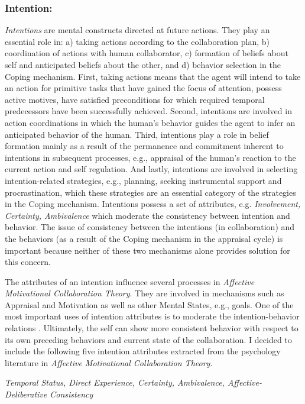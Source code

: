 \documentclass[letterpaper]{article}
\begin{document}
\subsubsection{Intention:}

\textit{Intentions} are mental constructs directed at future actions. They play
an essential role in: a) taking actions according to the collaboration plan, b)
coordination of actions with human collaborator, c) formation of beliefs about
self and anticipated beliefs about the other, and d) behavior selection in the
Coping mechanism. First, taking actions means that the agent will intend to take
an action for primitive tasks that have gained the focus of attention, possess
active motives, have satisfied preconditions for which required temporal
predecessors have been successfully achieved. Second, intentions are involved
in action coordinations in which the human's behavior guides the agent to infer
an anticipated behavior of the human. Third, intentions play a role in belief
formation mainly as a result of the permanence and commitment inherent to
intentions in subsequent processes, e.g., appraisal of the human's reaction to
the current action and self regulation. And lastly, intentions are involved in
selecting intention-related strategies, e.g., planning, seeking instrumental
support and procrastination, which these strategies are an essential category of
the strategies in the Coping mechanism. Intentions possess a set of attributes,
e.g. \textit{Involvement, Certainty, Ambivalence} which moderate the consistency
between intention and behavior. The issue of consistency between the intentions
(in collaboration) and the behaviors (as a result of the Coping mechanism in the
appraisal cycle) is important because neither of these two mechanisms alone
provides solution for this concern.

The attributes of an intention influence several processes in \textit{Affective
Motivational Collaboration Theory}. They are involved in mechanisms such as
Appraisal and Motivation as well as other Mental States, e.g., goals. One of the
most important uses of intention attributes is to moderate the
intention-behavior relations \cite{cooke:intention-behavior-consistency}.
Ultimately, the self can show more consistent behavior with respect to its own
preceding behaviors and current state of the collaboration. I decided to include
the following five intention attributes extracted from the psychology literature
in \textit{Affective Motivational Collaboration Theory}.

\textit{Temporal Status, Direct Experience, Certainty, Ambivalence,
Affective-Deliberative Consistency}
\end{document}
